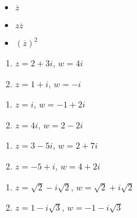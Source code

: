 \begin{multicols}{3}

\begin{itemize}

\item $\overline{z}$
\item $z\overline{z}$
\item $(\overline{z})^2$

\end{itemize}

\end{multicols}

\begin{multicols}{2}
\begin{enumerate}

\item  $z = 2+3i$, $w = 4i$ \label{compnumbasicfirst}
\item  $z = 1+i$, $w = -i$

\setcounter{HW}{\value{enumi}}
\end{enumerate}
\end{multicols}

\begin{multicols}{2}
\begin{enumerate}
\setcounter{enumi}{\value{HW}}

\item  $z = i$, $w = -1+2i$
\item  $z = 4i$, $w = 2-2i$

\setcounter{HW}{\value{enumi}}
\end{enumerate}
\end{multicols}

\begin{multicols}{2}
\begin{enumerate}
\setcounter{enumi}{\value{HW}}

\item  $z = 3-5i$, $w = 2+7i$
\item  $z = -5+i$, $w = 4+2i$

\setcounter{HW}{\value{enumi}}
\end{enumerate}
\end{multicols}


\begin{multicols}{2}
\begin{enumerate}
\setcounter{enumi}{\value{HW}}

\item  $z = \sqrt{2} - i\sqrt{2}$, $w = \sqrt{2} + i\sqrt{2}$
\item  $z = 1 - i\sqrt{3}$, $w = -1 - i\sqrt{3}$

\setcounter{HW}{\value{enumi}}
\end{enumerate}
\end{multicols}

